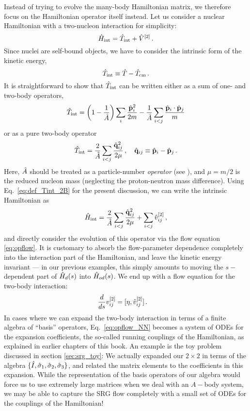 {Instead of trying to evolve the many-body Hamiltonian matrix, we therefore focus
on the Hamiltonian operator itself instead. Let us consider a nuclear Hamiltonian 
with a two-nucleon interaction for simplicity:
\begin{equation}
  \hat{H}_\text{int} = \hat{T}_\text{int} + \hat{V}^{[2]}\,.
\end{equation}
Since nuclei are self-bound objects, we have to consider the intrinsic form of the 
kinetic energy, 
\begin{equation}
  \hat{T}_\text{int} \equiv \hat{T} - \hat{T}_\text{cm}\,.
\end{equation}
It is straightforward to show that $\hat{T}_\text{int}$ can be written either as a sum of
one- and two-body operators,
\begin{equation}\label{eq:def_Tint_1B2B}
  \Tint= \left(1-\frac{1}{\AO}\right)\sum_{i}\frac{\pOV_i^2}{2m} - \frac{1}{\AO}\sum_{i<j}\frac{\pOV_{i}\cdot \pOV_{j}}{m}
\end{equation}
or as a pure two-body operator
\begin{equation}\label{eq:def_Tint_2B}
  \Tint= \frac{2}{\AO}\sum_{i<j}\frac{\qOV_{ij}^2}{2\mu}\,,\quad \qOV_{ij}\equiv\pOV_{i}-\pOV_{j}\,.
\end{equation}
Here, $\hat{A}$ should be treated as a particle-number \emph{operator} (see \cite{Hergert:2009wh}),
and $\mu=m/2$ is the reduced nucleon mass (neglecting the proton-neutron mass difference).
Using Eq.~\eqref{eq:def_Tint_2B} for the present discussion, we can write the intrinsic 
Hamiltonian as
\begin{equation}\label{eq:def_Hint_2B}
  \Hint = \frac{2}{\AO}\sum_{i<j}\frac{\qOV_{ij}^2}{2\mu} + \sum_{i<j}\vO^{[2]}_{ij}\,,
\end{equation}
and directly consider the evolution of this operator via the flow equation
\eqref{eq:opflow}. It is customary to absorb the flow-parameter dependence 
completely into the interaction part of the Hamiltonian, and leave the kinetic
energy invariant --- in our previous examples, this simply amounts to moving the
$s-$dependent part of $\hat{H}_d(s)$ into $\hat{H}_{od}(s)$. We end up with a flow equation 
for the two-body interaction:
\begin{align}\label{eq:opflow_NN}
  \totd{}{s}v^{[2]}_{ij} &= \comm{\eta}{\vO^{[2]}_{ij}}\,.
\end{align}
In cases where we can expand the two-body interaction in terms of a finite algebra of
``basis'' operators, Eq.~\eqref{eq:opflow_NN} becomes a system of ODEs for the expansion 
coefficients, the so-called running couplings of the Hamiltonian, as explained
in earlier chapters of this book. An example is the toy problem discussed in section 
\ref{sec:srg_toy}: We actually expanded our $2\times2$ in terms of the algebra 
$\{\hat{I},\hat{\sigma}_{1},\hat{\sigma}_{2},\hat{\sigma}_{3}\}$,
and related the matrix elements to the coefficients in this expansion. While 
the representation of the basis operators of our algebra would force us to use
extremely large matrices when we deal with an $A-$body system, we may be able
to capture the SRG flow completely with a small set of ODEs for the couplings 
of the Hamiltonian!

}
